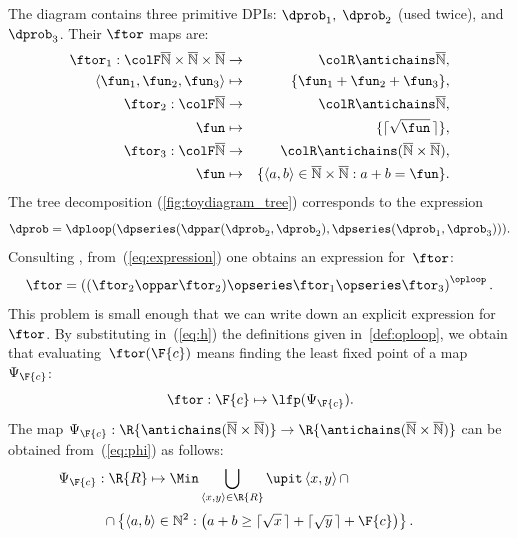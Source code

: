 \noindent The diagram contains three primitive DPIs: $\dprob_{1},$
$\dprob_{2}$ (used twice), and $\dprob_{3}$. Their $\ftor$ maps
are:
\begin{eqnarray*}
\ftor_{1}:{\colF\overline{\mathbb{N}}\times\overline{\mathbb{N}}\times\overline{\mathbb{N}}} & \rightarrow & {\colR\antichains\overline{\mathbb{N}}},\\
\left\langle \fun_{1},\fun_{2},\fun_{3}\right\rangle  & \mapsto & \{\fun_{1}+\fun_{2}+\fun_{3}\},\\
\ftor_{2}:{\colF\overline{\mathbb{N}}} & \rightarrow & {\colR\antichains\overline{\mathbb{N}}},\\
\fun& \mapsto & \{\lceil\sqrt{\fun}\,\rceil\},\\
\ftor_{3}:{\colF\overline{\mathbb{N}}} & \rightarrow & {\colR\antichains(\overline{\mathbb{N}}\times\overline{\mathbb{N}})},\\
\fun& \mapsto & \{\left\langle a,b\right\rangle \in\overline{\mathbb{N}}\times\overline{\mathbb{N}}:a+b=\fun\}.
\end{eqnarray*}
The tree decomposition (\cref{fig:toydiagram_tree}) corresponds to
the expression
\begin{equation}
\dprob=\dploop(\dpseries(\dppar(\dprob_{2},\dprob_{2}),\dpseries(\dprob_{1},\dprob_{3}))).\label{eq:expression}
\end{equation}
Consulting , from~(\ref{eq:expression})
one obtains an expression for~$\ftor$:
\begin{equation}
\ftor=\left((\ftor_{2}\oppar\ftor_{2})\opseries\ftor_{1}\opseries\ftor_{3}\right)^{\oploop}.\label{eq:h}
\end{equation}
This problem is small enough that we can write down an explicit expression
for~$\ftor$. By substituting in~(\ref{eq:h}) the definitions given
in~\textendash \ref{def:oploop}, we obtain that
evaluating~$\ftor(\F{c})$ means finding the least fixed point of
a map~$\Psi_{\F{c}}$:
\[
\ftor:\F{c}\mapsto\lfp(\Psi_{\F{c}}).
\]
The map $\Psi_{\F{c}}:\R{\antichains(\overline{\mathbb{N}}\times\overline{\mathbb{N}})}\rightarrow\R{\antichains(\overline{\mathbb{N}}\times\overline{\mathbb{N}})}$
can be obtained from~(\ref{eq:phi}) as follows:
\[
\Psi_{\F{c}}:\R{R}\mapsto\Min\bigcup_{\left\langle x,y\right\rangle \in\R{R}}\upit\left\langle x,y\right\rangle \cap\qquad\qquad\qquad\qquad
\]
\[
\cap\left\{ \left\langle a,b\right\rangle \in\mathbb{N}^{2}:\left(a+b\geq\lceil\sqrt{x}\,\rceil+\lceil\sqrt{y}\,\rceil+\F{c}\right)\right\} .
\]

